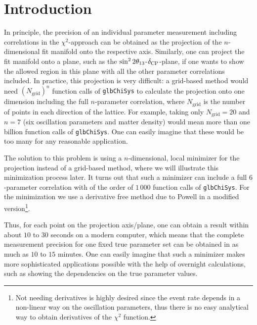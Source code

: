 \section{Introduction}

In principle, the precision of an individual parameter measurement including
 correlations in the $\chi^2$-approach can be obtained as the projection of 
the $n$-dimensional fit manifold onto the respective axis. Similarly, one can 
project the fit manifold onto a plane, such as the $\sin^2 2 \theta_{13}$-$\delta_{\mathrm{CP}}$-plane,
 if one wants to show the allowed
region in this plane with all the other parameter correlations included. 
In practice, this projection is very difficult: a grid-based method would 
need $(N_{\mathrm{grid}})^n$ function calls of {\tt glbChiSys} to 
calculate the projection onto one dimension 
including the full $n$-parameter correlation, where 
$N_{\mathrm{grid}}$ is the number of points in each direction of the 
lattice. For example, taking only $N_{\mathrm{grid}}=20$ and 
$n=7$ (six oscillation parameters and matter density) would mean more 
than one billion function calls of {\tt glbChiSys}. One can easily imagine 
that these would be too many for any reasonable application.

The solution to this problem is using a $n$-dimensional, local 
minimizer for the projection instead of a grid-based method, where we will
illustrate this minimization process later. It turns out
that such a minimizer can include a full $6$-parameter correlation 
with of the order of $1\, 000$ function calls of {\tt glbChiSys}. For the 
minimization we use a derivative free method due to Powell in a 
modified~\cite{Brent:1973} version\footnote{Not needing derivatives is
highly desired since the event rate depends in a non-linear way on the
oscillation parameters, thus there is no easy analytical way
to obtain derivatives of the $\chi^2$ function.}.

Thus, for each point on the projection axis/plane, one can obtain a result within about $10$ to $30$ seconds on a modern computer, which means that the complete measurement precision for one fixed true parameter set can be obtained in as much as $10$ to $15$ minutes. One can easily imagine that such a minimizer makes more sophisticated applications possible with the help of overnight calculations, such as showing the dependencies on the true parameter values.

